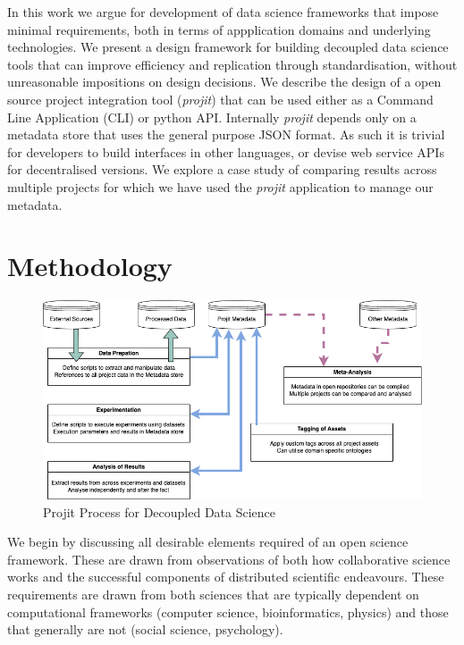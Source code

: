 \documentclass[sigconf]{acmart}
\begin{document}
In this work we argue for development of data science frameworks that impose minimal 
requirements, both in terms of appplication domains and underlying technologies. 
We present a design framework for building decoupled data science tools that can 
improve efficiency and replication through standardisation, without
unreasonable impositions on design decisions. We describe the design of a open 
source project integration tool (\textit{projit}) that can be used either as a 
Command Line Application (CLI) or python API. Internally \textit{projit} depends 
only on a metadata store that uses the general purpose JSON format. 
As such it is trivial for developers to build interfaces in other
languages, or devise web service APIs for decentralised versions. We explore a 
case study of comparing results across multiple projects for which we have used 
the \textit{projit} application to manage our metadata.

\section{Methodology}

\begin{figure}
\includegraphics[scale=0.6]{./Projit_decoupled_process.drawio.png}
\caption{Projit Process for Decoupled Data Science}
\label{fig:projit}
\end{figure}

We begin by discussing all desirable elements required of an open science framework. 
These are drawn from observations of both how collaborative science works and the 
successful components of distributed scientific endeavours. These requirements are 
drawn from both sciences that are typically dependent on computational frameworks 
(computer science, bioinformatics, physics) and those that generally are not
(social science, psychology).
\end{document}
